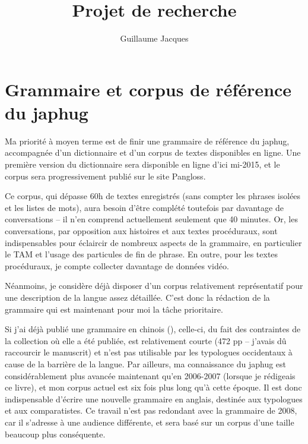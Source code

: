 \documentclass[oldfontcommands,oneside,a4paper,11pt]{article}
\begin{document}
\title{Projet de recherche} 
\author{Guillaume Jacques}
\maketitle

\sloppy
\tableofcontents
\section{Grammaire et corpus de référence du japhug}
Ma priorité à moyen terme est de finir une grammaire de référence du japhug, accompagnée d'un dictionnaire et d'un corpus de textes disponibles en ligne. Une première version du dictionnaire sera disponible en ligne d'ici mi-2015, et le corpus sera progressivement publié sur le site Pangloss. 

Ce corpus, qui dépasse 60h de textes enregistrés (sans compter les phrases isolées et les listes de mots), aura besoin d'être complété toutefois par davantage de conversations -- il n'en comprend actuellement seulement que 40 minutes. Or, les conversations, par opposition aux histoires et aux textes procéduraux, sont indispensables pour éclaircir de nombreux aspects de la grammaire, en particulier le TAM et l'usage des particules de fin de phrase. En outre, pour les textes procéduraux, je compte collecter davantage de données vidéo. 

Néanmoins, je considère déjà disposer d'un corpus relativement représentatif pour une description de la langue assez détaillée. C'est donc la rédaction de la grammaire qui est maintenant pour moi la tâche prioritaire.



Si j'ai déjà publié une grammaire en chinois (\citealt{jacques08zh}), celle-ci, du fait des contraintes de la collection où elle a été publiée, est relativement courte (472 pp -- j'avais dû raccourcir le manuscrit) et n'est pas utilisable par les typologues occidentaux à cause de la barrière de la langue. Par ailleurs, ma connaissance du japhug est considérablement plus avancée maintenant qu'en 2006-2007 (lorsque je rédigeais ce livre), et mon corpus actuel est six fois plus long qu'à cette époque. Il est donc indispensable d'écrire une nouvelle grammaire en anglais, destinée aux typologues et aux comparatistes.  Ce travail n'est pas redondant avec la grammaire de 2008, car il s'adresse à une audience différente, et sera basé sur un corpus d'une taille beaucoup plus conséquente.
\end{document}
